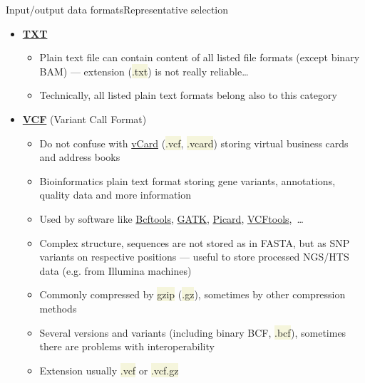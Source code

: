 \documentclass[compress, xelatex, 11pt, xcolor=svgnames, aspectratio=169,
	hyperref={
		bookmarks=true,
		unicode=true,
		colorlinks=true,
		pdftitle={Molecular data in R},
		plainpages=false,
		pdfauthor={Vojtech Zeisek},
		pdfsubject={Course about phylogeny and evolution in R},
		pdfcreator={XeLaTeX},
		pdfkeywords={R, evolution, phylogeny, molecular data},
		linkcolor=Crimson, %
		anchorcolor=Magenta, %
		citecolor=Magenta, %
		filecolor=Magenta, %
		menucolor=Magenta, %
		urlcolor=DodgerBlue, %
		},
	url={hyphens, lowtilde} %
	]{beamer}
\renewcommand{\texttt}[1]{\colorbox{Beige}{{\ttfamily #1}}}
\begin{document}
\begin{frame}[allowframebreaks]{Input/output data formats}{Representative selection}
\begin{itemize}
\begin{itemize}
			\item Extension usually \texttt{*.tsv}, \texttt{*.tab}
		\end{itemize}
		\item \href{https://en.wikipedia.org/wiki/Text_file}{\textbf{TXT}}
		\begin{itemize}
			\item Plain text file can contain content of all listed file formats (except binary BAM) --- extension (\texttt{*.txt}) is not really reliable\ldots
			\item Technically, all listed plain text formats belong also to this category
		\end{itemize}
		\item \href{https://en.wikipedia.org/wiki/Variant_Call_Format}{\textbf{VCF}} (Variant Call Format)
		\begin{itemize}
			\item Do not confuse with \href{https://en.wikipedia.org/wiki/VCard}{vCard} (\texttt{*.vcf}, \texttt{*.vcard}) storing virtual business cards and address books
			\item Bioinformatics plain text format storing gene variants, annotations, quality data and more information
			\item Used by software like \href{https://samtools.github.io/bcftools/}{Bcftools}, \href{https://gatk.broadinstitute.org/hc/en-us}{GATK}, \href{https://broadinstitute.github.io/picard/}{Picard}, \href{https://vcftools.github.io/}{VCFtools},~\ldots
			\item Complex structure, sequences are not stored as in FASTA, but as SNP variants on respective positions --- useful to store processed NGS/HTS data (e.g. from Illumina machines)
			\item Commonly compressed by \texttt{gzip} (\texttt{*.gz}), sometimes by other compression methods
			\item Several versions and variants (including binary BCF, \texttt{*.bcf}), sometimes there are problems with interoperability
			\item Extension usually \texttt{*.vcf} or \texttt{*.vcf.gz}
		\end{itemize}
	\end{itemize}
\end{frame}
\end{document}
